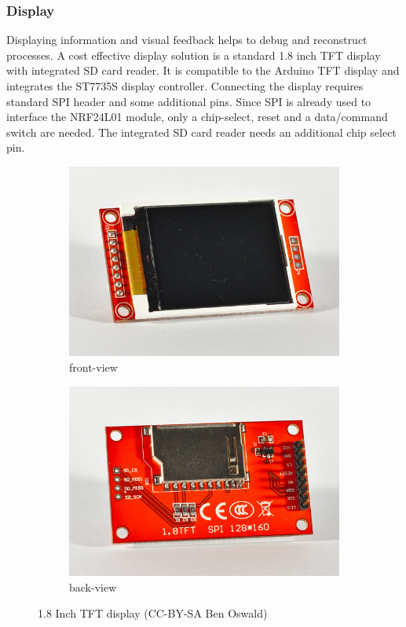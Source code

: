 \documentclass[11pt,a4paper]{article}
\begin{document}
\subsubsection{Display}
Displaying information and visual feedback helps to debug and reconstruct processes. A cost effective display solution is a standard 1.8 inch TFT display with integrated SD card reader. It is compatible to the Arduino TFT display and integrates the ST7735S display controller. Connecting the display requires standard SPI header and some additional pins. Since SPI is already used to interface the NRF24L01 module, only a chip-select, reset and a data/command switch are needed. The integrated SD card reader needs an additional chip select pin.

\begin{figure}[H]
  \centering
  \begin{subfigure}{0.48\textwidth}
  \centering
  \includegraphics[width=0.9\linewidth]{images/30_tftfront.jpg}
  \caption{front-view}
  \end{subfigure}
  \begin{subfigure}{0.48\textwidth}
  \centering
  \includegraphics[width=0.9\linewidth]{images/30_tftback.jpg}
  \caption{back-view}
  \end{subfigure}
  \caption{1.8 Inch TFT display (CC-BY-SA Ben Oswald)}
\end{figure}
\end{document}
